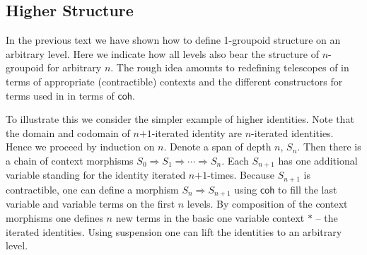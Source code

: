 

\subsection{Higher Structure} In the previous text we have shown how
to define 1-groupoid structure on an arbitrary level. Here we indicate
how all levels also bear the structure of $n$-groupoid for arbitrary
$n$. The rough idea amounts to redefining telescopes of \cite{txa:csl}
in terms of appropriate (contractible) contexts and the different
constructors for terms used in \cite{txa:csl} in terms of
$\mathsf{coh}$.

To illustrate this we consider the simpler example of higher
identities. Note that the domain and codomain of $n\text{+}1$-iterated
identity are $n$-iterated identities. Hence we proceed by induction on
$n$. Denote a span of depth $n$, $S_n$. Then there is a chain of
context morphisms $S_0 \Rightarrow S_1 \Rightarrow \cdots \Rightarrow
S_n$. Each $S_{n+1}$ has one additional variable standing for the
identity iterated $n\text{+}1$-times. Because $S_{n+1}$ is contractible, one
can define a morphism $S_n \Rightarrow S_{n+1}$ using $\mathsf{coh}$
to fill the last variable and variable terms on the first $n$
levels. By composition of the context morphisms one defines $n$ new
terms in the basic one variable context $*$ -- the iterated
identities. Using suspension one can lift the identities to an
arbitrary level.

